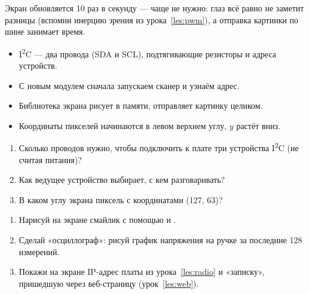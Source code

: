 
Экран обновляется 10 раз в секунду --- чаще не нужно: глаз всё равно не заметит разницы
(вспомни инерцию зрения из урока~\ref{les:pwm}), а отправка картинки по шине занимает время.

\begin{summary}
\begin{itemize}[leftmargin=*]
  \item I\textsuperscript{2}C --- два провода (SDA и SCL), подтягивающие резисторы и адреса устройств.
  \item С новым модулем сначала запускаем сканер и узнаём адрес.
  \item Библиотека экрана рисует в памяти,  отправляет картинку целиком.
  \item Координаты пикселей начинаются в левом верхнем углу, $y$ растёт вниз.
\end{itemize}
\end{summary}

\begin{quiz}
\begin{enumerate}
  \item Сколько проводов нужно, чтобы подключить к плате три устройства I\textsuperscript{2}C (не считая питания)?
  \item Как ведущее устройство выбирает, с кем разговаривать?
  \item В каком углу экрана пиксель с координатами (127, 63)?
\end{enumerate}
\end{quiz}

\begin{tasks}
\begin{enumerate}
  \item Нарисуй на экране смайлик с помощью  и .
  \item Сделай «осциллограф»: рисуй график напряжения на ручке за последние 128 измерений.
  \item Покажи на экране IP-адрес платы из урока~\ref{les:radio} и «записку», пришедшую через веб-страницу (урок~\ref{les:web}).
\end{enumerate}
\end{tasks}

